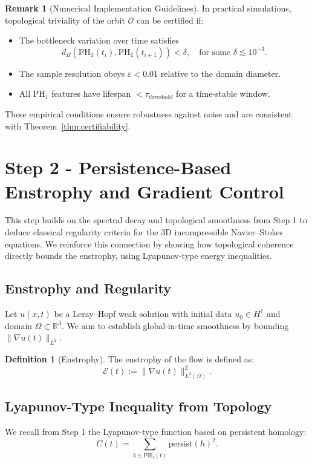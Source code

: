 \documentclass[11pt]{article}
\theoremstyle{definition}
\newtheorem{definition}[theorem]{Definition}
\newtheorem{remark}[theorem]{Remark}
\begin{document}
\begin{remark}[Numerical Implementation Guidelines]
In practical simulations, topological triviality of the orbit $\mathcal{O}$ can be certified if:
\begin{itemize}
    \item The bottleneck variation over time satisfies
    \[
    d_B(\mathrm{PH}_1(t_i), \mathrm{PH}_1(t_{i+1})) < \delta, \quad \text{for some } \delta \lesssim 10^{-3}.
    \]
    \item The sample resolution obeys $\varepsilon < 0.01$ relative to the domain diameter.
    \item All $\mathrm{PH}_1$ features have lifespan $< \tau_\text{threshold}$ for a time-stable window.
\end{itemize}
These empirical conditions ensure robustness against noise and are consistent with Theorem~\ref{thm:certifiability}.
\end{remark}


\section{Step 2 - Persistence-Based Enstrophy and Gradient Control}

This step builds on the spectral decay and topological smoothness from Step 1 to deduce classical regularity criteria for the 3D incompressible Navier--Stokes equations.
We reinforce this connection by showing how topological coherence directly bounds the enstrophy, using Lyapunov-type energy inequalities.

\subsection*{Enstrophy and Regularity}
Let $u(x,t)$ be a Leray--Hopf weak solution with initial data $u_0 \in H^1$ and domain $\Omega \subset \mathbb{R}^3$. We aim to establish global-in-time smoothness by bounding $\|\nabla u(t)\|_{L^2}$.

\begin{definition}[Enstrophy]
The enstrophy of the flow is defined as:
\[
\mathcal{E}(t) := \|\nabla u(t)\|_{L^2(\Omega)}^2.
\]
\end{definition}

\subsection*{Lyapunov-Type Inequality from Topology}
We recall from Step 1 the Lyapunov-type function based on persistent homology:
\[
C(t) = \sum_{h \in \mathrm{PH}_1(t)} \mathrm{persist}(h)^2.
\]
\end{document}
